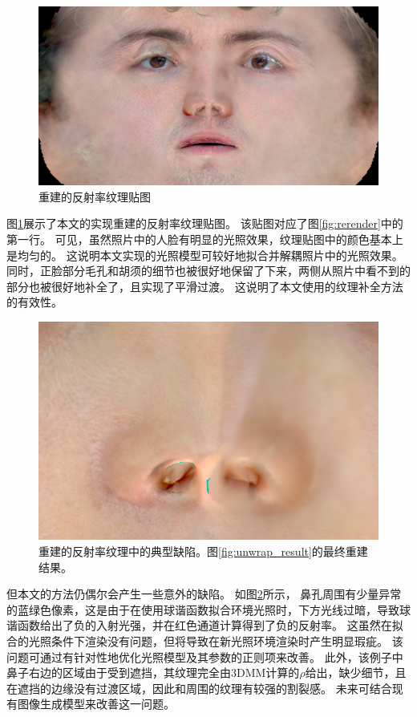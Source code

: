 \begin{figure}
    \centering
    \includegraphics[width=\linewidth]{figures/diffrast_face/00015/final_diffuse}
    \caption{重建的反射率纹理贴图}
    \label{fig:diffuse_map}
\end{figure}
图\ref{fig:diffuse_map}展示了本文的实现重建的反射率纹理贴图。
该贴图对应了图\ref{fig:rerender}中的第一行。
可见，虽然照片中的人脸有明显的光照效果，纹理贴图中的颜色基本上是均匀的。
这说明本文实现的光照模型可较好地拟合并解耦照片中的光照效果。
同时，正脸部分毛孔和胡须的细节也被很好地保留了下来，两侧从照片中看不到的部分也被很好地补全了，且实现了平滑过渡。
这说明了本文使用的纹理补全方法的有效性。
\begin{figure}[tb]
    \centering
    \includegraphics[width=0.6\linewidth,trim={0 0 0 200},clip]{figures/diffrast_face/04114/final_diffuse_center}
    \caption[重建的反射率纹理中的典型缺陷]{重建的反射率纹理中的典型缺陷。图\ref{fig:unwrap_result}的最终重建结果。}
    \label{fig:diffuse_map_defect}
\end{figure}
但本文的方法仍偶尔会产生一些意外的缺陷。
如图\ref{fig:diffuse_map_defect}所示，
鼻孔周围有少量异常的蓝绿色像素，这是由于在使用球谐函数拟合环境光照时，下方光线过暗，导致球谐函数给出了负的入射光强，并在红色通道计算得到了负的反射率。
这虽然在拟合的光照条件下渲染没有问题，但将导致在新光照环境渲染时产生明显瑕疵。
该问题可通过有针对性地优化光照模型及其参数的正则项来改善。
此外，该例子中鼻子右边的区域由于受到遮挡，其纹理完全由3DMM计算的$\rho$给出，缺少细节，且在遮挡的边缘没有过渡区域，因此和周围的纹理有较强的割裂感。
未来可结合现有图像生成模型来改善这一问题。

